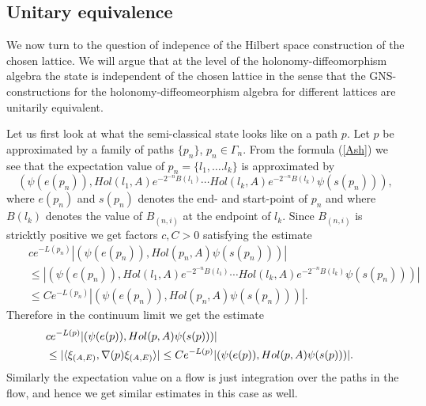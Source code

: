 \documentclass[12pt]{article}
\begin{document}
 
 













\subsection{Unitary equivalence}
We now turn to the question of indepence of the Hilbert space construction of the chosen lattice. We will argue that at the level of the holonomy-diffeomorphism algebra the state is independent of the chosen lattice in the sense that the GNS-constructions for the holonomy-diffeomeorphism algebra for different lattices are unitarily equivalent.  

Let us first look at what the semi-classical state looks like on a path $p$. Let $p$ be approximated by a family of paths $\{p_n \}$, $p_n\in \Gamma_n$. From the  formula (\ref{Ash})  we see that the expectation value of $p_n=\{l_1,\ldots. l_k \}$ is approximated by 
$$ (\psi (e(p_n)), Hol(l_1,A)e^{- 2^{-n}B(l_1)}\cdots Hol(l_k,A)e^{- 2^{-n}B(l_k)}\psi (s(p_n)))  ,
\label{HSc}$$
where $e(p_n)$ and $s(p_n)$ denotes the end- and start-point of $p_n$ and where $B(l_k)$ denotes the value of $B_{(n,i)}$ at the endpoint of $l_k$.
Since $B_{(n,i)}$ is stricktly positive we get factors $c,C>0$ satisfying the estimate
\begin{eqnarray*}
&&ce^{-L(p_n)}| (\psi (e(p_n)),Hol (p_n,A)\psi (s(p_n)))|\\
&& \leq |(\psi (e(p_n)), Hol(l_1,A)e^{- 2^{-n}B(l_1)}\cdots Hol(l_k,A)e^{- 2^{-n}B(l_k)}\psi (s(p_n)))| \\ && \leq   Ce^{-L(p_n)}| (\psi (e(p_n)),Hol (p_n,A)\psi (s(p_n)))| .
\end{eqnarray*}
Therefore in the continuum limit we get the estimate 
\begin{eqnarray*}
\lefteqn{ce^{-L(p)}| (\psi (e(p)),Hol (p,A)\psi (s(p)))|} \\
&\leq |\langle \xi_{(A,E)}  ,\nabla(p)   \xi_{(A,E)}\rangle |  \leq   Ce^{-L(p)}| (\psi (e(p)),Hol (p,A)\psi (s(p)))| .
\end{eqnarray*}
Similarly the expectation value on a flow is just integration over the paths in the flow, and hence we get similar estimates in this case as well.
\end{document}
